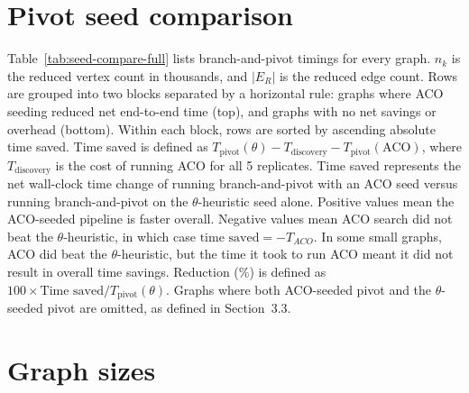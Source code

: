 \documentclass[conference]{IEEEtran}
\begin{document}
\section{Pivot seed comparison}
Table~\ref{tab:seed-compare-full} lists branch-and-pivot timings for every graph. $n_k$ is the reduced vertex count in thousands, and $|E_R|$ is the reduced edge count.
Rows are grouped into two blocks separated by a horizontal rule: graphs where ACO seeding reduced net end-to-end time (top), and graphs with no net savings or overhead (bottom). Within each block, rows are sorted by ascending absolute time saved.
Time saved is defined as $T_{\mathrm{pivot}}(\theta) - T_{\mathrm{discovery}} - T_{\mathrm{pivot}}(\mathrm{ACO})$, where $T_{\mathrm{discovery}}$ is the cost of running ACO for all 5 replicates. Time saved represents the net wall-clock time change of running branch-and-pivot with an ACO seed versus running branch-and-pivot on the $\theta$-heuristic seed alone. Positive values mean the ACO-seeded pipeline is faster overall. Negative values mean ACO search did not beat the $\theta$-heuristic, in which case $\text{time saved} = -T_{ACO}$. In some small graphs, ACO did beat the $\theta$-heuristic, but the time it took to run ACO meant it did not result in overall time savings. Reduction (\%) is defined as $100 \times \text{Time saved} / T_{\mathrm{pivot}}(\theta)$. Graphs where both ACO-seeded pivot and the $\theta$-seeded pivot are omitted, as defined in Section~3.3.

\appendix
\onecolumn
\section{Graph sizes}
\label{app:sizes}
\end{document}
